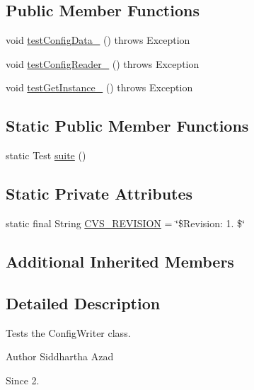 \subsection*{Public Member Functions}
\begin{DoxyCompactItemize}
\item 
void \hyperlink{classorg_1_1jgap_1_1gui_1_1_config_writer_test_a689d2d62adc54d0523e5c94ded843546}{test\-Config\-Data\-\_} ()  throws Exception 
\item 
void \hyperlink{classorg_1_1jgap_1_1gui_1_1_config_writer_test_a0af8cb48cfc5ec0cf4a857d5ba3780d6}{test\-Config\-Reader\-\_} ()  throws Exception 
\item 
void \hyperlink{classorg_1_1jgap_1_1gui_1_1_config_writer_test_a745b843f831669c4a4e6947bc7f0a37c}{test\-Get\-Instance\-\_} ()  throws Exception 
\end{DoxyCompactItemize}
\subsection*{Static Public Member Functions}
\begin{DoxyCompactItemize}
\item 
static Test \hyperlink{classorg_1_1jgap_1_1gui_1_1_config_writer_test_a1f810de914e6aafbe2d5a0c07a953eb2}{suite} ()
\end{DoxyCompactItemize}
\subsection*{Static Private Attributes}
\begin{DoxyCompactItemize}
\item 
static final String \hyperlink{classorg_1_1jgap_1_1gui_1_1_config_writer_test_a486d40f48be376e04ba0f1c7fb87ddc9}{C\-V\-S\-\_\-\-R\-E\-V\-I\-S\-I\-O\-N} = \char`\"{}\$Revision\-: 1. \$\char`\"{}
\end{DoxyCompactItemize}
\subsection*{Additional Inherited Members}


\subsection{Detailed Description}
Tests the Config\-Writer class.

\begin{DoxyAuthor}{Author}
Siddhartha Azad 
\end{DoxyAuthor}
\begin{DoxySince}{Since}
2. 
\end{DoxySince}



